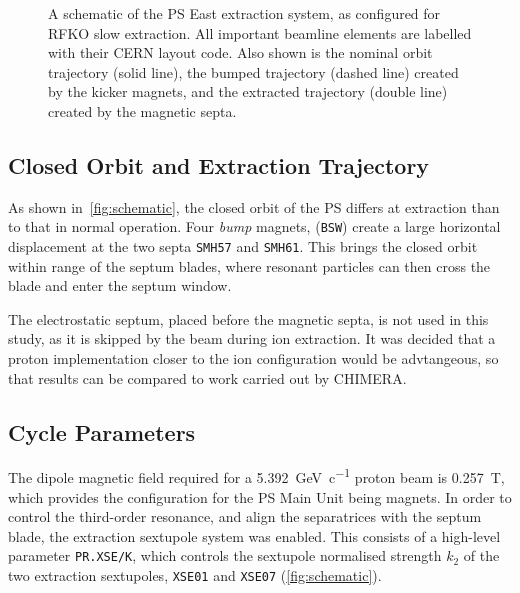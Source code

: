 \documentclass[11pt]{report}
\begin{document}
\begin{figure}
  \caption{A schematic of the PS East extraction system, as configured for RFKO slow extraction. All important beamline elements are labelled with their CERN layout code. Also shown is the nominal orbit trajectory (solid line), the bumped trajectory (dashed line) created by the kicker magnets, and the extracted trajectory (double line) created by the magnetic septa.}\label{fig:schematic}
\end{figure}

\subsection{Closed Orbit and Extraction Trajectory}

As shown in~\autoref{fig:schematic}, the closed orbit of the PS differs at extraction than to that in normal operation. Four \textit{bump} magnets, (\verb|BSW|) create a large horizontal displacement at the two septa \verb|SMH57| and \verb|SMH61|. This brings the closed orbit within range of the septum blades, where resonant particles can then cross the blade and enter the septum window.

The electrostatic septum, placed before the magnetic septa, is not used in this study, as it is skipped by the beam during ion extraction. It was decided that a proton implementation closer to the ion configuration would be advtangeous, so that results can be compared to work carried out by CHIMERA.

\subsection{Cycle Parameters}\label{sec:magcycle}

The dipole magnetic field required for a \qty[per-mode=symbol]{5.392}{\giga\electronvolt\per~c} proton beam is \qty{0.257}{\tesla}, which provides the configuration for the PS Main Unit being magnets. In order to control the third-order resonance, and align the separatrices with the septum blade, the extraction sextupole system was enabled. This consists of a high-level parameter \verb|PR.XSE/K|, which controls the sextupole normalised strength $k_2$ of the two extraction sextupoles, \verb|XSE01| and \verb|XSE07| (\autoref{fig:schematic}). 
\end{document}
